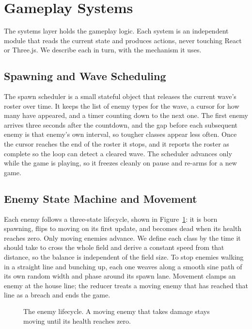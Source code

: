 \documentclass[12pt,a4paper]{report}
\begin{document}
\section{Gameplay Systems}

The systems layer holds the gameplay logic. Each system is an independent module
that reads the current state and produces actions, never touching React or
Three.js. We describe each in turn, with the mechanism it uses.

\subsection{Spawning and Wave Scheduling}

The spawn scheduler is a small stateful object that releases the current wave's
roster over time. It keeps the list of enemy types for the wave, a cursor for how
many have appeared, and a timer counting down to the next one. The first enemy
arrives three seconds after the countdown, and the gap before each subsequent
enemy is that enemy's own interval, so tougher classes appear less often. Once
the cursor reaches the end of the roster it stops, and it reports the roster as
complete so the loop can detect a cleared wave. The scheduler advances only while
the game is playing, so it freezes cleanly on pause and re-arms for a new game.

\subsection{Enemy State Machine and Movement}

Each enemy follows a three-state lifecycle, shown in Figure~\ref{fig:enemystate}:
it is born spawning, flips to moving on its first update, and becomes dead when
its health reaches zero. Only moving enemies advance. We define each class by the
time it should take to cross the whole field and derive a constant speed from
that distance, so the balance is independent of the field size. To stop enemies
walking in a straight line and bunching up, each one weaves along a smooth sine
path of its own random width and phase around its spawn lane. Movement clamps an
enemy at the house line; the reducer treats a moving enemy that has reached that
line as a breach and ends the game.

\begin{figure}[htbp]
\centering
{}
\caption{The enemy lifecycle. A moving enemy that takes damage stays moving
until its health reaches zero.}
\label{fig:enemystate}
\end{figure}
\end{document}
